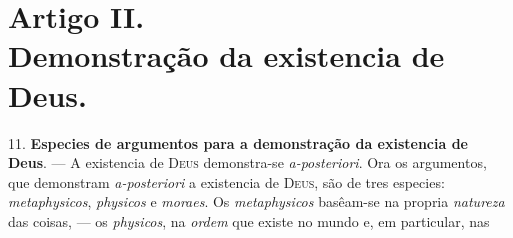 
\section*{Artigo II.\\ Demonstração da existencia de Deus.}

11. \textbf{Especies de argumentos para a demonstração da existencia de Deus}. --- A existencia de \textsc{Deus} demonstra-se \emph{a-posteriori}. Ora os argumentos, que demonstram \emph{a-posteriori} a existencia de   \textsc{Deus}, são de tres especies: \emph{metaphysicos}, \emph{physicos} e \emph{moraes}. Os \emph{metaphysicos} basêam-se na propria \emph{natureza} das coisas, --- os \emph{physicos}, na \emph{ordem} que existe no mundo e, em particular, nas 